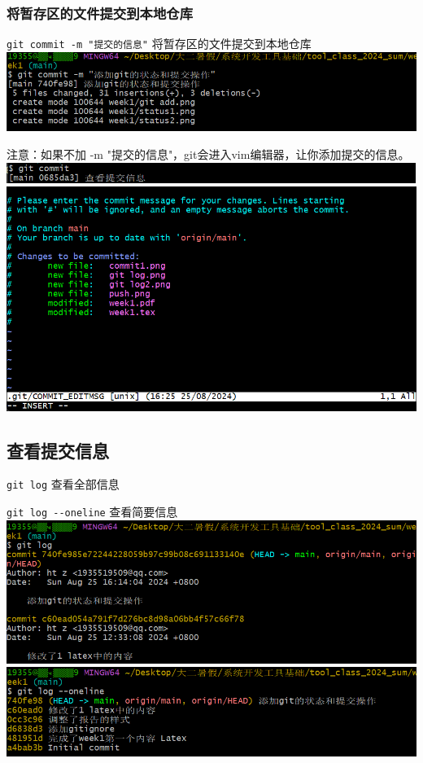 \documentclass[UTF8,a4paper]{ctexart}
\begin{document}
\subsubsection{将暂存区的文件提交到本地仓库}
\verb|git commit -m "提交的信息"| \quad 将暂存区的文件提交到本地仓库\\
\includegraphics[width=1\textwidth]{commit1.png}\par
注意：如果不加 -m "提交的信息"，git会进入vim编辑器，让你添加提交的信息。\\
\includegraphics[width=1\textwidth]{commit2-1.png}\\
\includegraphics[width=1\textwidth]{commit2-2.png}\par

\subsection{查看提交信息}
\verb|git log| \quad 查看全部信息\par
\verb|git log --oneline| \quad 查看简要信息\\
\includegraphics[width=1\textwidth]{git log.png}\\
\includegraphics[width=1\textwidth]{git log2.png}
\end{document}
